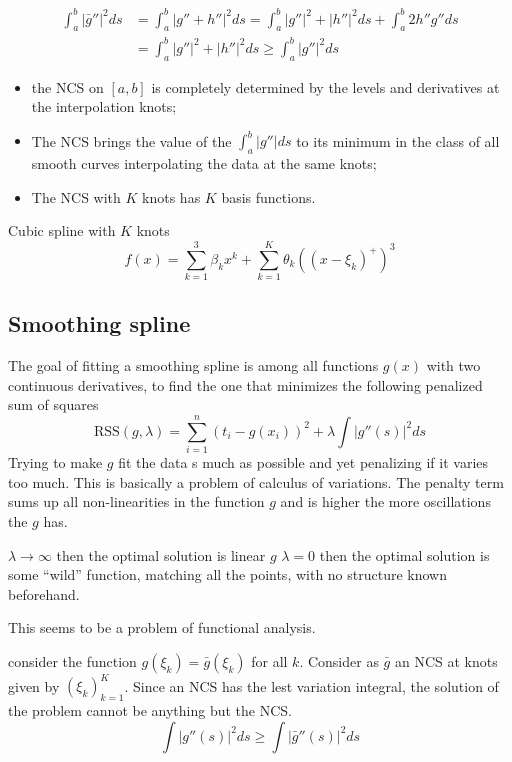 \documentclass[a4paper]{article}
\newcommand{\clo}[1]{{\left [ #1 \right ]}}
\newcommand{\brac}[1]{{\left ( #1 \right )}}
\newcommand{\abs}[1]{{\left | #1 \right |}}
\newcommand{\RSS}{\text{RSS}}
\begin{document}
\begin{align*}
\int_a^b \abs{\bar{g}''}^2 ds
	&= \int_a^b \abs{g'' + h''}^2 ds = \int_a^b \abs{g''}^2 + \abs{h''}^2 ds + \int_a^b 2h''g'' ds\\
	&= \int_a^b \abs{g''}^2 + \abs{h''}^2 ds \geq \int_a^b \abs{g''}^2 ds
\end{align*}

\begin{itemize}
	\item the NCS on $\clo{a,b}$ is completely determined by the levels and derivatives at the interpolation knots;
	\item The NCS brings the value of the $\int_a^b \abs{g''}ds$ to its minimum in the class of all smooth curves interpolating the data at the same knots;
	\item The NCS with $K$ knots has $K$ basis functions.
\end{itemize}


Cubic spline with $K$ knots
\[f(x) = \sum_{k=1}^3 \beta_k x^k + \sum_{k=1}^K \theta_k \brac{\brac{x-\xi_k}^+}^3\]



\subsection{Smoothing spline} %
\label{sub:smoothing_spline}

The goal of fitting a smoothing spline is among all functions $g(x)$ with two continuous derivatives, to find the one that minimizes the following penalized sum of squares
\[\RSS(g,\lambda) = \sum_{i=1}^n \brac{t_i - g(x_i)}^2 + \lambda \int \abs{g''(s)}^2 ds\]
Trying to make $g$ fit the data s much as possible and yet penalizing if it varies too much. This is basically a problem of calculus of variations. The penalty term sums up all non-linearities in the function $g$ and is higher the more oscillations the $g$ has.

$\lambda\to \infty$ then the optimal solution is linear $g$
$\lambda = 0$ then the optimal solution is some ``wild'' function, matching all the points, with no structure known beforehand.


This seems to be a problem of functional analysis.

consider the function $g(\xi_k) = \bar{g}(\xi_k)$ for all $k$.
Consider as $\bar{g}$ an NCS at knots given by $\brac{\xi_k}_{k=1}^K$.
Since an NCS has the lest variation integral, the solution of the problem cannot be anything but the NCS.
\[\int \abs{g''(s)}^2 ds\geq \int \abs{\bar{g}''(s)}^2 ds\]
\end{document}
